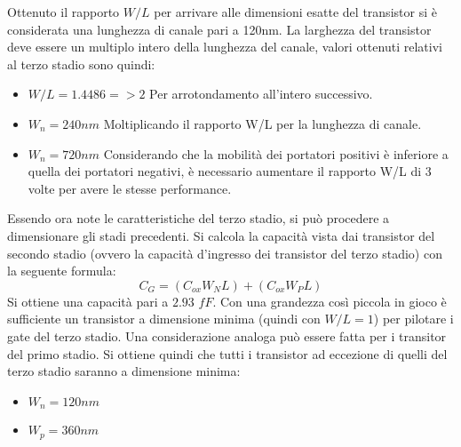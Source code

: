 \documentclass[12pt]{article} %
\begin{document}
Ottenuto il rapporto $W/L$ per arrivare alle dimensioni esatte del transistor si è considerata una lunghezza di canale pari a 120nm. La larghezza del transistor deve essere un multiplo intero della lunghezza del canale, valori ottenuti relativi al terzo stadio sono quindi:

\begin{itemize}
\item $W/L = 1.4486 => 2$  Per arrotondamento all'intero successivo.
\item $W_{n} = 240 nm$ Moltiplicando il rapporto W/L per la lunghezza di canale.
\item $W_{n} = 720 nm$ Considerando che la mobilità dei portatori positivi è inferiore a quella dei portatori negativi, è necessario aumentare il rapporto W/L di 3 volte per avere le stesse performance.
\end{itemize}

Essendo ora note le caratteristiche del terzo stadio, si può procedere a dimensionare gli stadi precedenti.
Si calcola la capacità vista dai transistor del secondo stadio (ovvero la capacità d'ingresso dei transistor del terzo stadio) con la seguente formula:
\begin{equation} 
C_{G}= (C_{ox}W_{N}L) + (C_{ox}W_{P}L)
\end{equation}
Si ottiene una capacità pari a $2.93$ $fF$. Con una grandezza così piccola in gioco è sufficiente un transistor a dimensione minima (quindi con $W/L =1$) per pilotare i gate del terzo stadio.
Una considerazione analoga può essere fatta per i transitor del primo stadio. Si ottiene quindi che tutti i transistor ad eccezione di quelli del terzo stadio saranno a dimensione minima:

\begin{itemize}
\item $W_{n} = 120 nm$
\item $W_{p} = 360 nm$
\end{itemize}
\end{document}
